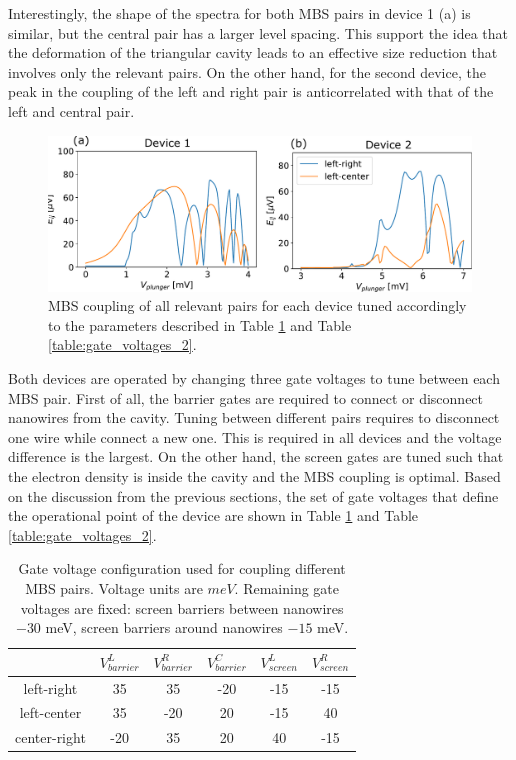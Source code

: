 Interestingly, the shape of the spectra for both MBS pairs in device 1 (a) is similar, but the central pair has a larger level spacing.
This support the idea that the deformation of the triangular cavity leads to an effective size reduction that involves only the relevant pairs.
On the other hand, for the second device, the peak in the coupling of the left and right pair is anticorrelated with that of the left and central pair.

\begin{figure}[h!]
\centering
  \includegraphics[width=0.8\linewidth]{figures/device_couplings.pdf}
  \caption{MBS coupling of all relevant pairs for each device tuned accordingly to the parameters described in Table \ref{table:gate_voltages_1} and Table \ref{table:gate_voltages_2}.}
  \label{fig:devices_coupling}
\end{figure}

Both devices are operated by changing three gate voltages to tune between each MBS pair.
First of all, the barrier gates are required to connect or disconnect nanowires from the cavity.
Tuning between different pairs requires to disconnect one wire while connect a new one.
This is required in all devices and the voltage difference is the largest.
On the other hand, the screen gates are tuned such that the electron density is inside the cavity and the MBS coupling is optimal.
Based on the discussion from the previous sections, the set of gate voltages that define the operational point of the device are shown in Table \ref{table:gate_voltages_1} and Table \ref{table:gate_voltages_2}.

\begin{table}[h!]
\centering
\begin{tabular}{||c ||c c c c c ||} 
 \hline
& $V_{barrier}^L$ & $V_{barrier}^R$ & $V_{barrier}^C$ & $V_{screen}^L$ & $V_{screen}^R$ \\
 \hline\hline
 left-right & 35 & 35 & -20 & -15 & -15\\ 
 \hline
 left-center & 35 & -20 & 20 & -15 & 40\\ 
 \hline
 center-right & -20 & 35 & 20 & 40 & -15\\ 
 \hline
 \hline
\end{tabular}
\caption{Gate voltage configuration used for coupling different MBS pairs. Voltage units are $meV$. Remaining gate voltages are fixed: screen barriers between nanowires $-30$ meV, screen barriers around nanowires $-15$ meV.}
\label{table:gate_voltages_1}
\end{table}

